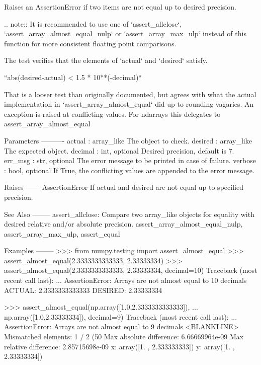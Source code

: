 \begin{DoxyVerb}Raises an AssertionError if two items are not equal up to desired
precision.

.. note:: It is recommended to use one of `assert_allclose`,
          `assert_array_almost_equal_nulp` or `assert_array_max_ulp`
          instead of this function for more consistent floating point
          comparisons.

The test verifies that the elements of `actual` and `desired` satisfy.

    ``abs(desired-actual) < 1.5 * 10**(-decimal)``

That is a looser test than originally documented, but agrees with what the
actual implementation in `assert_array_almost_equal` did up to rounding
vagaries. An exception is raised at conflicting values. For ndarrays this
delegates to assert_array_almost_equal

Parameters
----------
actual : array_like
    The object to check.
desired : array_like
    The expected object.
decimal : int, optional
    Desired precision, default is 7.
err_msg : str, optional
    The error message to be printed in case of failure.
verbose : bool, optional
    If True, the conflicting values are appended to the error message.

Raises
------
AssertionError
  If actual and desired are not equal up to specified precision.

See Also
--------
assert_allclose: Compare two array_like objects for equality with desired
                 relative and/or absolute precision.
assert_array_almost_equal_nulp, assert_array_max_ulp, assert_equal

Examples
--------
>>> from numpy.testing import assert_almost_equal
>>> assert_almost_equal(2.3333333333333, 2.33333334)
>>> assert_almost_equal(2.3333333333333, 2.33333334, decimal=10)
Traceback (most recent call last):
    ...
AssertionError:
Arrays are not almost equal to 10 decimals
 ACTUAL: 2.3333333333333
 DESIRED: 2.33333334

>>> assert_almost_equal(np.array([1.0,2.3333333333333]),
...                     np.array([1.0,2.33333334]), decimal=9)
Traceback (most recent call last):
    ...
AssertionError:
Arrays are not almost equal to 9 decimals
<BLANKLINE>
Mismatched elements: 1 / 2 (50%
Max absolute difference: 6.66669964e-09
Max relative difference: 2.85715698e-09
 x: array([1.         , 2.333333333])
 y: array([1.        , 2.33333334])\end{DoxyVerb}
 \mbox{\label{namespacenumpy_1_1testing_1_1__private_1_1utils_a699b0a6a00ac32270a029fbd04bd64b0}} 
